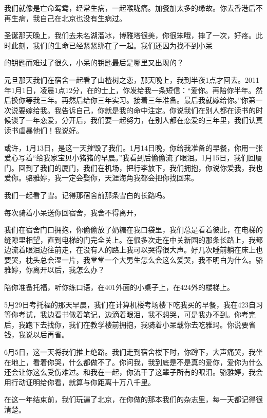 \documentclass{article}
\begin{document}
我们就像是亡命鸳鸯，经常生病，一起喉咙痛。加餐加太多的缘故。你去香港后不再生病，我自己在北京也没有生病过。

圣诞那天晚上，我们去未名湖溜冰，博雅塔很美，你很笨哦，摔了一次，好疼。此时此刻，我们的生命已经紧紧绑在了一起。我们还因为找不到小呆

\newpage 

的钥匙而难过了很久，小呆的钥匙最后是哪里又出现的？

元旦那天我们在宿舍一起看了山楂树之恋，那天晚上，我到半夜1点才回去。2011年1月1日，凌晨1点12分，在的士上，你发给我一条短信：“爱你。再陪你半年。然后换你等我三年。再然后给你三年实习。接着三年准备。最后我就嫁给你。”你第一次说要嫁给我。我告诉自己，你就是我的命中注定。你说我们在别人都在读书的时候谈了一年恋爱，分开后，我们要一起努力，在别人都在恋爱的三年里，我们认真读书虐暴他们！我说好。

或许，1月13日，是这一天摧毁了我们。1月14日晚，你给我准备的早餐，你用一张爱心写着“给我家宝贝小猪猪的早晨。”我看到后偷偷流了眼泪。1月15日，我们回厦门。回到了我们的厦门，我们在机场，把行李放下，我们拥抱，你说你爱我，我也爱你。骆雅婷，我一定会娶你，天涯海角我都会把你找回来。

我们一起看了雪。记得那宿舍前那条雪白的长路吗。

每次骑着小呆送你回宿舍，我舍不得离开，

\newpage 

我们在宿舍门口拥抱，你偷偷放了奶糖在我口袋里，我们总是看着彼此，在电梯的缝隙里相望，直到电梯的门完全关上。在很多次走在中关新园的那条长路上，我都边流着眼泪边往前走，在没有人的路上我可以哭得很大声。好几次睡前躺在床上也要哭，枕头总会湿一片，我堂堂一个大男生怎么会这么爱哭，我不明白为什么。骆雅婷，你离开以后，我怎么办？

陪你准备托福，听你练口语，在401外面的小桌子上，在424外的楼梯上。

5月29日考托福的那天早晨，我们在计算机楼考场楼下吃我买的早餐，我在423自习等你考试，我边看书做着笔记，边滴着眼泪，我不想哭，可是我办不到。你考完后，我跑下去找你，我们在教学楼前拥抱，我骑着小呆载你去吃雅玛。你说要省钱，我说以后再省。

6月5日，这一天将我们推上绝路。我们走到宿舍楼下时，你蹲下，大声痛哭，我坐在地上，看着你哭，什么都做不了。你问我，我到底是不是真的爱你，爱你为什么还会让你这么受伤难过。和我在一起，你流干了这辈子所有的眼泪。骆雅婷，我会用行动证明给你看，就算与你距离十万八千里。

\newpage 



在这一年结束前，我们玩遍了北京，在你做的那本我们的杂志里，每一天都记得很清楚。
\end{document}
